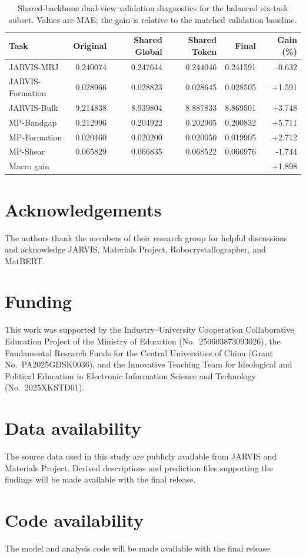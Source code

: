 \documentclass[a4paper,fleqn]{cas-sc}
\begin{document}
\begin{table}[!htbp]
\caption{Shared-backbone dual-view validation diagnostics for the balanced six-task subset. Values are MAE; the gain is relative to the matched validation baseline.}
\label{tab:sbdvf_compact}\centering\scriptsize
\begin{tabular}{lrrrrr}\toprule
Task&Original&Shared Global&Shared Token&Final&Gain (\%)\\\midrule
JARVIS-MBJ&0.240074&0.247644&0.244046&0.241591&-0.632\\
JARVIS-Formation&0.028966&0.028823&0.028645&0.028505&+1.591\\
JARVIS-Bulk&9.214838&8.939804&8.887833&8.869501&+3.748\\
MP-Bandgap&0.212996&0.204922&0.202905&0.200832&+5.711\\
MP-Formation&0.020460&0.020200&0.020050&0.019905&+2.712\\
MP-Shear&0.065829&0.066835&0.068522&0.066976&-1.744\\\midrule
Macro gain&&&&&+1.898\\
\bottomrule\end{tabular}
\end{table}


\FloatBarrier
\section*{Acknowledgements}
The authors thank the members of their research group for helpful discussions and acknowledge JARVIS, Materials Project, Robocrystallographer, and MatBERT.
\section*{Funding}
This work was supported by the Industry--University Cooperation Collaborative Education Project of the Ministry of Education (No.~250603873093026), the Fundamental Research Funds for the Central Universities of China (Grant No.~PA2025GDSK0036), and the Innovative Teaching Team for Ideological and Political Education in Electronic Information Science and Technology (No.~2025XKSTD01).
\section*{Data availability}
The source data used in this study are publicly available from JARVIS and Materials Project. Derived descriptions and prediction files supporting the findings will be made available with the final release.
\section*{Code availability}
The model and analysis code will be made available with the final release.
\end{document}
